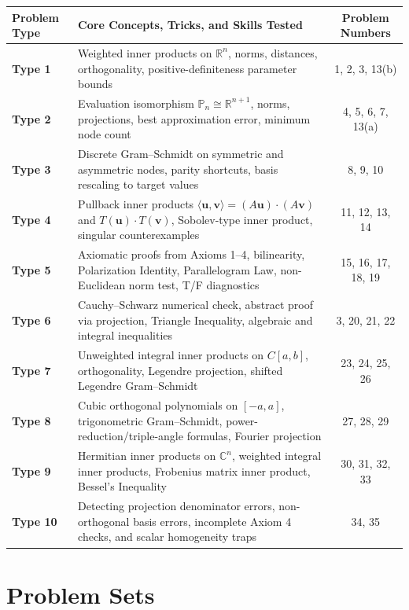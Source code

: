 \documentclass[11pt, letterpaper]{article}
\theoremstyle{definition}
\theoremstyle{remark}
\begin{document}
\renewcommand{\arraystretch}{1.5}
\begin{tabularx}{\textwidth}{>{\bfseries}l X c}
\toprule
Problem Type & Core Concepts, Tricks, and Skills Tested & Problem Numbers \\
\midrule
Type 1 & Weighted inner products on $\mathbb{R}^n$, norms, distances, orthogonality, positive-definiteness parameter bounds & 1, 2, 3, 13(b) \\
Type 2 & Evaluation isomorphism $\mathbb{P}_n \cong \mathbb{R}^{n+1}$, norms, projections, best approximation error, minimum node count & 4, 5, 6, 7, 13(a) \\
Type 3 & Discrete Gram--Schmidt on symmetric and asymmetric nodes, parity shortcuts, basis rescaling to target values & 8, 9, 10 \\
Type 4 & Pullback inner products $\langle \mathbf{u}, \mathbf{v} \rangle = (A\mathbf{u})\cdot(A\mathbf{v})$ and $T(\mathbf{u})\cdot T(\mathbf{v})$, Sobolev-type inner product, singular counterexamples & 11, 12, 13, 14 \\
Type 5 & Axiomatic proofs from Axioms 1--4, bilinearity, Polarization Identity, Parallelogram Law, non-Euclidean norm test, T/F diagnostics & 15, 16, 17, 18, 19 \\
Type 6 & Cauchy--Schwarz numerical check, abstract proof via projection, Triangle Inequality, algebraic and integral inequalities & 3, 20, 21, 22 \\
Type 7 & Unweighted integral inner products on $C[a, b]$, orthogonality, Legendre projection, shifted Legendre Gram--Schmidt & 23, 24, 25, 26 \\
Type 8 & Cubic orthogonal polynomials on $[-a, a]$, trigonometric Gram--Schmidt, power-reduction/triple-angle formulas, Fourier projection & 27, 28, 29 \\
Type 9 & Hermitian inner products on $\mathbb{C}^n$, weighted integral inner products, Frobenius matrix inner product, Bessel's Inequality & 30, 31, 32, 33 \\
Type 10 & Detecting projection denominator errors, non-orthogonal basis errors, incomplete Axiom 4 checks, and scalar homogeneity traps & 34, 35 \\
\bottomrule
\end{tabularx}

\newpage

\section{Problem Sets}
\end{document}
